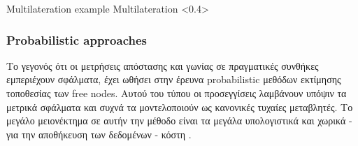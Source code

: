 %
{Multilateration example}%
{Multilateration}%
<0.4>

\subsubsection{Probabilistic approaches}
Το γεγονός ότι οι μετρήσεις απόστασης και γωνίας σε πραγματικές συνθήκες εμπε\-ριέ\-χουν σφάλματα, έχει ωθήσει στην έρευνα 
probabilistic μεθόδων εκτίμησης τοποθεσίας των free nodes. Αυτού του τύπου οι προσεγγίσεις λαμβάνουν υπόψιν τα μετρικά σφάλματα και συχνά τα μοντελοποιούν ως κανονικές
τυχαίες μεταβλητές. Το μεγάλο μειονέκτημα σε αυτήν την μέθοδο είναι τα μεγάλα υπολογιστικά και χωρικά - για την αποθήκευση των δεδομένων - κόστη \cite{wsn-Localization-systems}. 

